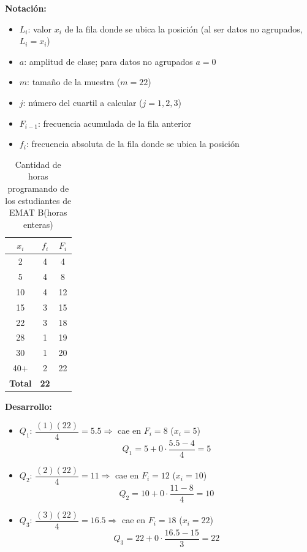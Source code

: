 \documentclass[12pt,letterpaper]{article}
\begin{document}
\textbf{Notación:}
\begin{itemize}
    \item $L_i$: valor $x_i$ de la fila donde se ubica la posición (al ser datos no agrupados, $L_i = x_i$)
    \item $a$: amplitud de clase; para datos no agrupados $a = 0$
    \item $m$: tamaño de la muestra ($m=22$)
    \item $j$: número del cuartil a calcular ($j=1,2,3$)
    \item $F_{i-1}$: frecuencia acumulada de la fila anterior
    \item $f_i$: frecuencia absoluta de la fila donde se ubica la posición
\end{itemize}

\begin{table}[H]
    \centering
    \caption{Cantidad de horas programando de los estudiantes de EMAT B(horas enteras)}
    \label{tab:mediana-cuantiles-horas}
    \begin{tabular}{@{}ccc@{}}
        \toprule
        $x_i$ & $f_i$ & $F_i$ \\
        \midrule
        2 & 4 & 4 \\
        5 & 4 & 8 \\
        10 & 4 & 12 \\
        15 & 3 & 15 \\
        22 & 3 & 18 \\
        28 & 1 & 19 \\
        30 & 1 & 20 \\
        40+ & 2 & 22 \\
        \midrule
        \textbf{Total} & \textbf{22} & \\
        \bottomrule
    \end{tabular}
\end{table}

\textbf{Desarrollo:}

\begin{itemize}
    \item $Q_1$: $\dfrac{(1)(22)}{4}=5.5 \Rightarrow$ cae en $F_i=8$ ($x_i=5$)
    \begin{equation*}
        Q_1 = 5 + 0 \cdot \frac{5.5 - 4}{4} = 5
    \end{equation*}
    \item $Q_2$: $\dfrac{(2)(22)}{4}=11 \Rightarrow$ cae en $F_i=12$ ($x_i=10$)
    \begin{equation*}
        Q_2 = 10 + 0 \cdot \frac{11 - 8}{4} = 10
    \end{equation*}
    \item $Q_3$: $\dfrac{(3)(22)}{4}=16.5 \Rightarrow$ cae en $F_i=18$ ($x_i=22$)
    \begin{equation*}
        Q_3 = 22 + 0 \cdot \frac{16.5 - 15}{3} = 22
    \end{equation*}
\end{itemize}
\end{document}
